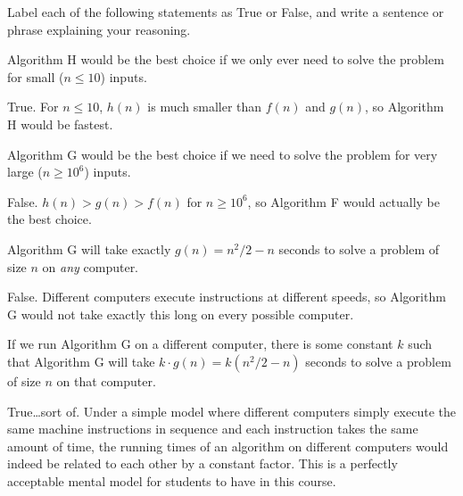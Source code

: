 \documentclass{tufte-handout}
\begin{document}
\begin{questions}
  Label each of the following statements as True or False, and write
  a sentence or phrase explaining your reasoning.
  \begin{subquestions}
    \item Algorithm H would be the best choice if we only ever need to
      solve the problem for small ($n \leq 10$) inputs.
      \begin{answer}
        True.  For $n \leq 10$, $h(n)$ is much smaller than $f(n)$ and
        $g(n)$, so Algorithm H would be fastest.
      \end{answer}
    \item Algorithm G would be the best choice if we need to solve the
      problem for very large ($n \geq 10^6$) inputs.
      \begin{answer}
        False.  $h(n) > g(n) > f(n)$ for $n \geq 10^6$, so Algorithm F
        would actually be the best choice.
      \end{answer}
    \item Algorithm G will take exactly $g(n) = n^2/2 - n$ seconds to
      solve a problem of size $n$ on \emph{any} computer.
      \begin{answer}
        False.  Different computers execute instructions at different
        speeds, so Algorithm G would not take exactly this long on
        every possible computer.
      \end{answer}
    \item If we run Algorithm G on a different computer, there is some
      constant $k$ such that Algorithm G will take $k \cdot g(n) = k (n^2/2 - n)$
      seconds to solve a problem of size $n$ on that computer.
      \begin{answer}
        True\dots sort of.  Under a simple model where different
        computers simply execute the same machine instructions in
        sequence and each instruction takes the same amount of time,
        the running times of an algorithm on different computers would
        indeed be related to each other by a constant factor.  This is
        a perfectly acceptable mental model for students to have in
        this course.


\end{answer}
\end{subquestions}
\end{questions}
\end{document}
